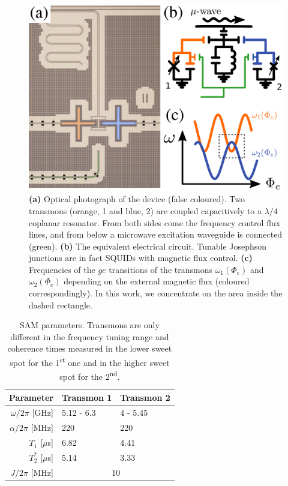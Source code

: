 \documentclass[%
 aip,
 amsmath,amssymb,
 reprint,%
]{revtex4-1}
\begin{document}
\begin{figure}
	\includegraphics[width=\linewidth]{experiment}
	\caption{\textbf{(a)} Optical photograph of the device (false coloured). Two transmons (orange, 1 and blue, 2) are coupled capacitively to a $\lambda/4$ coplanar resonator. From both sides come the frequency control flux lines, and from below a microwave excitation waveguide is connected (green). \textbf{(b)} The equivalent electrical circuit. Tunable Josephson junctions are in fact SQUIDs with magnetic flux control. \textbf{(c)} Frequencies of the $ge$ transitions of the transmons $\omega_1(\Phi_e)$ and $\omega_2(\Phi_e)$ depending on the external magnetic flux (coloured correspondingly). In this work, we concentrate on the area inside the dashed rectangle.}
	\label{fig:experiment}
\end{figure}


\begin{table}
	\begin{ruledtabular}
	\begin{tabular}{rll}
	Parameter & Transmon 1  & Transmon 2\\\hline
	$\omega/2\pi$ [GHz] & 5.12 - 6.3  & 4 - 5.45\\
	$\alpha/2\pi$ [MHz] & 220 & 220 \\
	$T_1$ [$\mu$s]  & 6.82 &  4.41 \\
	$T_2^*$ [$\mu$s]  & 5.14  &  3.33\\\hline
	$J/2\pi$ [MHz] &\multicolumn{2}{c}{10} 
	\end{tabular}
	\end{ruledtabular}
	\caption{SAM parameters. Transmons are only different in the frequency tuning range and coherence times measured in the lower sweet spot for the 1\textsuperscript{st} one and in the higher sweet spot for the 2\textsuperscript{nd}.}
\end{table}
\end{document}
